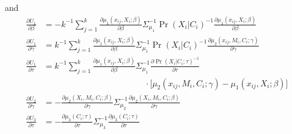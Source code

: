 \documentclass[]{article}
\begin{document}
\noindent and
\begin{align*}
\displaystyle \frac{\partial U_1}{\partial \beta} &= - k^{-1} \sum_{j=1}^{k} \frac{\partial \mu_1(x_{ij},X_i;\beta)}{\partial \beta} \Sigma_{\mu_1}^{-1} \Pr(X_i\vert C_i)^{-1} \frac{\partial \mu_1(x_{ij},X_i;\beta)}{\partial \beta}\\[0.6em]
\displaystyle \frac{\partial U_1}{\partial \gamma} &= k^{-1} \sum_{j=1}^{k} \frac{\partial \mu_1(x_{ij},X_i;\beta)}{\partial \beta} \Sigma_{\mu_1}^{-1} \Pr(X_i\vert C_i)^{-1} \frac{\partial \mu_2(x_{ij}, M_i,C_i;\gamma)}{\partial \gamma}\\[0.6em]
\displaystyle \frac{\partial U_1}{\partial \tau} &= k^{-1} \sum_{j=1}^{k} \frac{\partial \mu_1(x_{ij},X_i;\beta)}{\partial \beta} \Sigma_{\mu_1}^{-1} \frac{\partial \Pr(X_i\vert C_i;\tau)^{-1}}{\partial \tau}\\[-0.6em] & \qquad \qquad \qquad \qquad \qquad \qquad \cdot \big[ \mu_2(x_{ij},M_i,C_i;\gamma) - \mu_1(x_{ij},X_i;\beta) \big]\\[0.6em]
\displaystyle \frac{\partial U_2}{\partial \gamma} &= - \frac{\partial \mu_2(X_i,M_i,C_i;\beta)}{\partial \gamma} \Sigma_{\mu_2}^{-1} \frac{\partial \mu_2(X_i,M_i,C_i;\beta)}{\partial \gamma}\\[0.6em]
\displaystyle \frac{\partial U_3}{\partial \tau} &= - \frac{\partial \mu_3(C_i;\tau)}{\partial \tau} \Sigma_{\mu_3}^{-1} \frac{\partial \mu_3(C_i;\tau)}{\partial \tau}
\end{align*}
\end{document}
